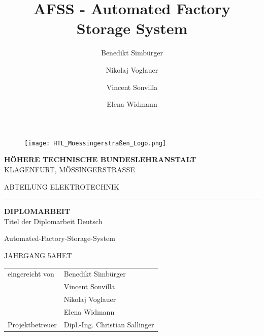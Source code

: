 \documentclass[12pt, twoside]{article}
\title{AFSS - Automated Factory Storage System}
\author{Benedikt Simbürger \\
    \and Nikolaj Voglauer \\
    \and Vincent Sonvilla \\
    \and Elena Widmann
    }
\begin{document}

\setlength{\parindent}{0pt}

\begin{figure}[h]
    \vspace{-5mm}
    \texttt{[image: HTL\_Moessingerstraßen\_Logo.png]}
    \centering
\end{figure}

\begin{center}
    \Large \textbf{HÖHERE TECHNISCHE BUNDESLEHRANSTALT} \\
    \vspace{5mm}
    \Large{KLAGENFURT, MÖSSINGERSTRASSE}

\end{center}

\vspace{7mm}

\begin{center}
    \Large{ABTEILUNG ELEKTROTECHNIK}
\end{center}

\hrule

\vspace{10mm}

\begin{center}
    \Huge \textbf{DIPLOMARBEIT} \\
    \vspace{7mm}
    \huge{Titel der Diplomarbeit Deutsch}

    \vspace{7mm}
    \huge{Automated-Factory-Storage-System}

    \vspace{7mm}
    \Large{JAHRGANG 5AHET}

\end{center}

\vspace{15mm}

\begin{flushleft}
    \linespread{1}
    \bgroup
        \large
        \def\arraystretch{1.5}
        \begin{tabular}{p{5cm}l}
            eingereicht von & Benedikt Simbürger\\
            & Vincent Sonvilla\\
            & Nikolaj Voglauer\\
            & Elena Widmann\\
            Projektbetreuer & Dipl.-Ing. Christian Sallinger
        \end{tabular}
    \egroup
\end{flushleft}
\end{document}
